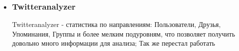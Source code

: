 \begin{chap1}
\begin{itemize}
\item \subsubsection{Twitteranalyzer}
Twitteranalyzer - статистика по  направлениям: Пользователи, Друзья, Упоминания, Группы и более мелким подуровням, что позволяет получить довольно много информации для анализа; Так же перестал работать


\end{itemize}
\end{chap1}
